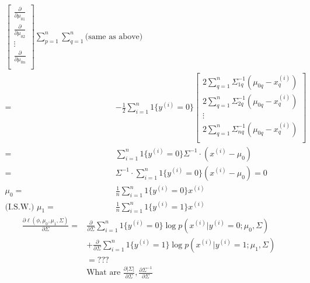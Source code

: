 \begin{answer}
\begin{align*}
\begin{bmatrix}
    \frac{\partial}{\partial\mu_{01}} \\
    \frac{\partial}{\partial\mu_{02}} \\
    \vdots \\
    \frac{\partial}{\partial\mu_{0n}} \\
    \end{bmatrix} 
    \sum_{p=1}^n \sum_{q=1}^n \textrm{(same as above)} \\
    =& -\frac{1}{2}\sum_{i=1}^n 1\{y^{(i)}=0\} 
    \begin{bmatrix}
    2\sum_{q=1}^n \Sigma_{1q}^{-1} (\mu_{0q} - x^{(i)}_q) \\
    2\sum_{q=1}^n \Sigma_{2q}^{-1} (\mu_{0q} - x^{(i)}_q) \\
    \vdots \\
    2\sum_{q=1}^n \Sigma_{nq}^{-1} (\mu_{0q} - x^{(i)}_q) \\
    \end{bmatrix} \\
    =& \sum_{i=1}^n 1\{y^{(i)}=0\} \Sigma^{-1} \cdot (x^{(i)} - \mu_{0}) \\
    =& \Sigma^{-1} \cdot \sum_{i=1}^n 1\{y^{(i)}=0\} (x^{(i)} - \mu_{0}) = 0 \\
    \mu_{0} =& \frac{1}{n}\sum_{i=1}^n 1\{y^{(i)}=0\} x^{(i)} \\
    \textrm{(I.S.W.) } \mu_{1} =& \frac{1}{n}\sum_{i=1}^n 1\{y^{(i)}=1\} x^{(i)}
\end{align*}
\begin{align*}
    \frac{\partial\ell(\phi, \mu_{0}, \mu_{1}, \Sigma)}{\partial\Sigma} 
    =& \frac{\partial}{\partial\Sigma}
    \sum_{i=1}^n 1\{y^{(i)}=0\}\log p(x^{(i)} | y^{(i)}=0; \mu_{0}, \Sigma) \\
    &+ \frac{\partial}{\partial\Sigma} 
    \sum_{i=1}^n 1\{y^{(i)}=1\}\log p(x^{(i)} | y^{(i)}=1; \mu_{1}, \Sigma) \\
    &= ??? \\
    & \textrm{What are } \frac{\partial|\Sigma|}{\partial\Sigma}, \frac{\partial\Sigma^{-1}}{\partial\Sigma}
\end{align*}
\end{answer}
